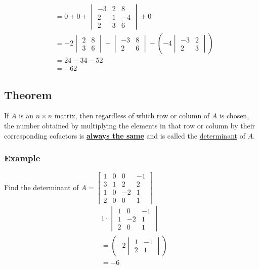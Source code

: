 \documentclass[
  letterpaper,
  DIV=11,
  numbers=noendperiod]{scrartcl}
\begin{document}
\begin{align*}
&= 0 + 0 + \begin{vmatrix}-3 & 2 & 8 \\ 2 & 1 & -4 \\ 2 & 3 & 6\end{vmatrix}+0 \\
&= -2\begin{vmatrix}2 & 8 \\ 3 & 6 \end{vmatrix} + \begin{vmatrix}-3 & 8 \\ 2 & 6 \end{vmatrix}-\left(-4\begin{vmatrix}-3 & 2 \\ 2 & 3\end{vmatrix}\right) \\
&= 24 -34 -52 \\
&= -62
\end{align*}

\hypertarget{theorem}{%
\subsection{Theorem}\label{theorem}}

If \(A\) is an \(n \times n\) matrix, then regardless of which row or
column of \(A\) is chosen, the number obtained by multiplying the
elements in that row or column by their corresponding cofactors is
\ul{\textbf{always the same}} and is called the \ul{determinant} of
\(A\).

\hypertarget{example-2}{%
\subsubsection{Example}\label{example-2}}

Find the determinant of
\(A=\begin{bmatrix}1 & 0 & 0 & -1 \\ 3 & 1 & 2 & 2 \\ 1 & 0 & -2 & 1 \\ 2 & 0 & 0 & 1\end{bmatrix}\)
\begin{align*}
&1\cdot\begin{vmatrix}1 & 0 & -1 \\ 1 & -2 & 1 \\ 2 & 0 & 1 \end{vmatrix} \\
&=\left(-2\begin{vmatrix}1 & -1 \\ 2 & 1\end{vmatrix}\right) \\
&= -6
\end{align*}
\end{document}
